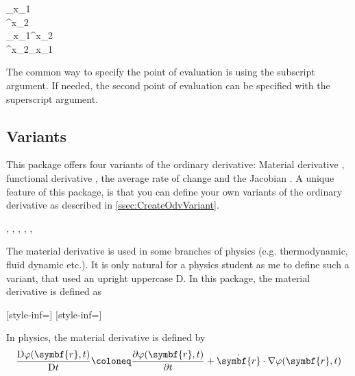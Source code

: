 \documentclass[final,british,10pt]{scrartcl}
\theoremstyle{remark}
\begin{document}
\begin{function}
\begin{argument}{6}
			\begin{example}
				_{x_1} \\
				^{x_2} \\
				_{x_1}^{x_2} \\
				^{x_2}_{x_1}
			\end{example}
			
			The common way to specify the point of evaluation is using the subscript argument. If needed, the second point of evaluation can be specified with the superscript argument.
		\end{argument}
		
	\end{function}
	
	\subsection{Variants}
	This package offers four variants of the ordinary derivative: Material derivative \macro{\mdv}, functional derivative \macro{\fdv}, the average rate of change \macro{\adv} and the Jacobian \macro{\jdv}. A unique feature of this package, is that you can define your own variants of the ordinary derivative as described in \cref{ssec:CreateOdvVariant}.
	
	\begin{function}{\mdv}
		\begin{syntax}
			\sarg, , , \targ{/}, , 
		\end{syntax}
		The material derivative is used in some branches of physics (e.g. thermodynamic, fluid dynamic etc.). It is only natural for a physics student as me to define such a variant, that used an upright uppercase D. In this package, the material derivative is defined as
		
		\begin{definition}
			[style-inf=\mathrm]%
			[style-inf=\symup]
		\end{definition}
		
		\noindent In physics, the material derivative is defined by
		\begin{equation*}
		\mdv{ \varphi(\symbf{r}, t) }{ t } \coloneq \pdv{ \varphi(\symbf{r}, t) }{ t } + \dot{\symbf{r}} \cdot \nabla \varphi(\symbf{r}, t)
		\end{equation*}
	\end{function}
	
\end{document}
